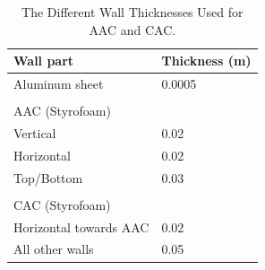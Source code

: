 \begin{table}[H]
\centering

{\color{blue}\begin{tabular}{ll}
\hline
\multicolumn{1}{|l|}{\textbf{Wall part}}              & \multicolumn{1}{l|}{\textbf{Thickness (m)}} \\ \hline
\multicolumn{1}{|l|}{Aluminum sheet}         & \multicolumn{1}{l|}{0.0005}        \\ \hline
                                             &                                    \\ \cline{1-1}
\multicolumn{1}{|l|}{AAC (Styrofoam)}        &                                    \\ \hline
\multicolumn{1}{|l|}{Vertical}               & \multicolumn{1}{l|}{0.02}          \\ \hline
\multicolumn{1}{|l|}{Horizontal}             & \multicolumn{1}{l|}{0.02}          \\ \hline
\multicolumn{1}{|l|}{Top/Bottom}             & \multicolumn{1}{l|}{0.03}          \\ \hline
                                             &                                    \\ \cline{1-1}
\multicolumn{1}{|l|}{CAC (Styrofoam)}        &                                    \\ \hline
\multicolumn{1}{|l|}{Horizontal towards AAC} & \multicolumn{1}{l|}{0.02}          \\ \hline
\multicolumn{1}{|l|}{All other walls}        & \multicolumn{1}{l|}{0.05}          \\ \hline
\end{tabular}}
\caption{\color{blue}The Different Wall Thicknesses Used for AAC and CAC.}
\label{tab:Wall-thickness-AAC-CAC}
\end{table}

